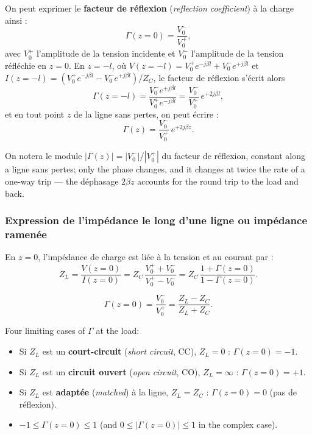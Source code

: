 \begin{definition}
  On peut exprimer le \textbf{facteur de réflexion} (\textit{reflection
  coefficient}) à la charge ainsi :
  \[
    \Gamma(z=0) = \frac{V_0^{-}}{V_0^{+}},
  \]
  avec $V_0^{+}$ l'amplitude de la tension incidente et $V_0^{-}$ l'amplitude
  de la tension réfléchie en $z=0$. En $z = -l$, où
  $V(z=-l) = V_0^{+}e^{-j\beta l} + V_0^{-}e^{+j\beta l}$ et
  $I(z=-l) = \left(V_0^{+}e^{-j\beta l} - V_0^{-}e^{+j\beta l}\right)/Z_C$,
  le facteur de réflexion s'écrit alors
  \[
    \Gamma(z=-l) = \frac{V_0^{-}e^{+j\beta l}}{V_0^{+}e^{-j\beta l}}
                 = \frac{V_0^{-}}{V_0^{+}}\,e^{+2j\beta l},
  \]
  et en tout point $z$ de la ligne sans pertes, on peut écrire :
  \[
    \boxed{\; \Gamma(z) = \frac{V_0^{-}}{V_0^{+}}\,e^{+2j\beta z}. \;}
  \]
\end{definition}

On notera le module $|\Gamma(z)| = |V_0^{-}|/|V_0^{+}|$ du facteur de
réflexion, constant along a ligne sans pertes; only the phase changes, and it
changes at twice the rate of a one-way trip --- the déphasage $2\beta z$
accounts for the round trip to the load and back.

\subsubsection{Expression de l'impédance le long d'une ligne ou impédance ramenée}
En $z=0$, l'impédance de charge est liée à la tension et au courant par :
\[
  Z_L = \frac{V(z=0)}{I(z=0)} = Z_C\,\frac{V_0^{+} + V_0^{-}}{V_0^{+} - V_0^{-}}
      = Z_C\,\frac{1+\Gamma(z=0)}{1-\Gamma(z=0)} .
\]

\begin{theorem}
  \[
    \boxed{\;
    \Gamma(z=0) = \frac{V_0^{-}}{V_0^{+}} = \frac{Z_L - Z_C}{Z_L + Z_C} .
    \;}
  \]
\end{theorem}

\begin{notation}
  Four limiting cases of $\Gamma$ at the load:
  \begin{itemize}
    \item Si $Z_L$ est un \textbf{court-circuit} (\textit{short circuit}, CC),
      $Z_L = 0$ : $\Gamma(z=0) = -1$.
    \item Si $Z_L$ est un \textbf{circuit ouvert} (\textit{open circuit}, CO),
      $Z_L = \infty$ : $\Gamma(z=0) = +1$.
    \item Si $Z_L$ est \textbf{adaptée} (\textit{matched}) à la ligne,
      $Z_L = Z_C$ : $\Gamma(z=0) = 0$ (pas de réflexion).
    \item $-1 \le \Gamma(z=0) \le 1$ (and $0 \le |\Gamma(z=0)| \le 1$ in the
      complex case).
  \end{itemize}
\end{notation}

